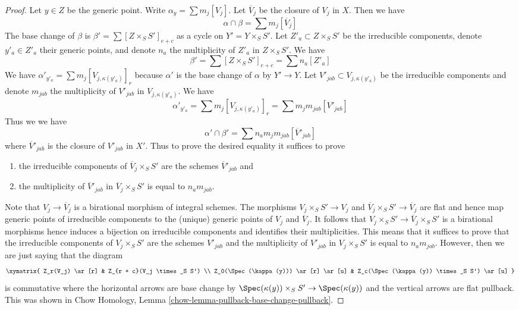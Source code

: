 \begin{proof}
\medskip\noindent
Let $y \in Z$ be the generic point. Write $\alpha_y = \sum m_j [V_j]$.
Let $\overline{V}_j$ be the closure of $V_j$ in $X$. Then we have
$$
\alpha \cap \beta = \sum m_j[\overline{V}_j]
$$
The base change of $\beta$ is $\beta' = \sum [Z \times_S S']_{e + c}$ as a
cycle on $Y' = Y \times_S S'$. Let $Z'_a \subset Z \times_S S'$
be the irreducible components, denote $y'_a \in Z'_a$ their generic points,
and denote $n_a$ the multiplicity of $Z'_a$ in $Z \times_S S'$.
We have
$$
\beta' = \sum [Z \times_S S']_{e + c} = \sum n_a[Z'_a]
$$
We have $\alpha'_{y'_a} = \sum m_j [V_{j, \kappa(y'_a)}]_r$
because $\alpha'$ is the base change of $\alpha$ by $Y' \to Y$.
Let $V'_{jab} \subset V_{j, \kappa(y'_a)}$ be the irreducible components
and denote $m_{jab}$ the multiplicity of $V'_{jab}$
in $V_{j, \kappa(y'_a)}$. We have
$$
\alpha'_{y'_a} = \sum m_j [V_{j, \kappa(y'_a)}]_r =
\sum m_j m_{jab} [V'_{jab}]
$$
Thus we we have
$$
\alpha' \cap \beta' = \sum n_a m_j m_{jab} [\overline{V}'_{jab}]
$$
where $\overline{V}'_{jab}$ is the closure of $V'_{jab}$ in $X'$.
Thus to prove the desired equality it suffices to prove
\begin{enumerate}
\item the irreducible components of $\overline{V}_j \times_S S'$
are the schemes $\overline{V}'_{jab}$ and
\item the multiplicity of $\overline{V}'_{jab}$ in
$\overline{V}_j \times_S S'$ is equal to $n_a m_{jab}$.
\end{enumerate}
Note that $V_j \to \overline{V}_j$ is a birational morphism of
integral schemes. The morphisms $V_j \times_S S' \to V_j$
and $\overline{V}_j \times_S S' \to \overline{V}_j$ are flat
and hence map generic points of irreducible components to the
(unique) generic points of $V_j$ and $\overline{V}_j$.
It follows that $V_j \times_S S' \to \overline{V}_j \times_S S'$
is a birational morphisms hence induces a bijection on irreducible
components and identifies their multiplicities.
This means that it suffices to prove that the irreducible components of
$V_j \times_S S'$ are the schemes $V'_{jab}$ and
the multiplicity of $V'_{jab}$ in $V_j \times_S S'$
is equal to $n_a m_{jab}$. However, then we are just saying
that the diagram
$$
\xymatrix{
Z_r(V_j) \ar[r] & Z_{r + c}(V_j \times_S S') \\
Z_0(\Spec(\kappa(y))) \ar[r] \ar[u] &
Z_c(\Spec(\kappa(y)) \times_S S') \ar[u]
}
$$
is commutative where the horizontal arrows are base change by
$\Spec(\kappa(y)) \times_S S' \to \Spec(\kappa(y))$ and
the vertical arrows are flat pullback. This was shown in
Chow Homology, Lemma \ref{chow-lemma-pullback-base-change-pullback}.


\end{proof}
